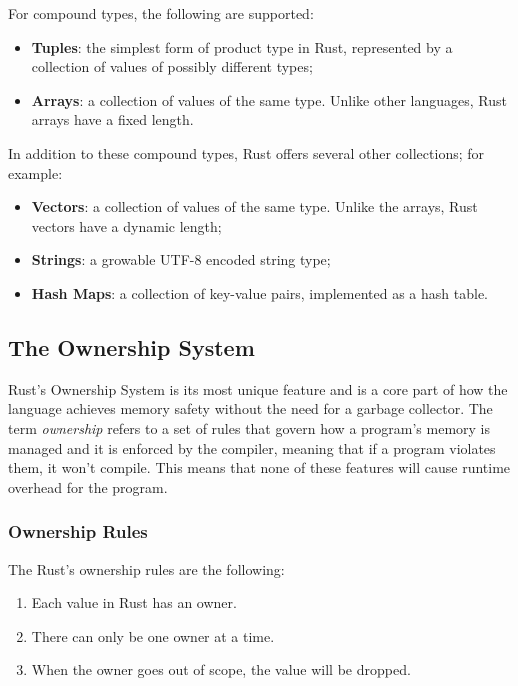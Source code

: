 For compound types, the following are supported:
\begin{itemize}
    \item \textbf{Tuples}: the simplest form of product type in Rust, represented by a collection of values of possibly different types;
    \item \textbf{Arrays}: a collection of values of the same type. Unlike other languages, Rust arrays have a fixed length.
\end{itemize}

In addition to these compound types, Rust offers several other collections; for example:

\begin{itemize}
    \item \textbf{Vectors}: a collection of values of the same type. Unlike the arrays, Rust vectors have a dynamic length;
    \item \textbf{Strings}: a growable UTF-8 encoded string type;
    \item \textbf{Hash Maps}: a collection of key-value pairs, implemented as a hash table.
\end{itemize}


\subsection{The Ownership System}
Rust's Ownership System is its most unique feature and is a core part of how the language achieves memory safety without the need for a garbage collector.
The term \textit{ownership} refers to a set of rules that govern how a program's memory is managed and it is enforced by the compiler, meaning that if
a program violates them, it won't compile. This means that none of these features will cause runtime overhead for the program.

\subsubsection{Ownership Rules}
The Rust's ownership rules are the following:

\begin{enumerate}
    \item Each value in Rust has an owner.
    \item There can only be one owner at a time.
    \item When the owner goes out of scope, the value will be dropped.
\end{enumerate}

